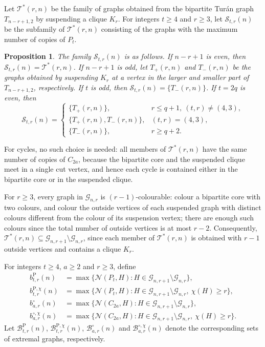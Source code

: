 \documentclass[11pt]{article}
\newtheorem{proposition}[theorem]{Proposition}
\theoremstyle{definition}
\theoremstyle{plain}
\theoremstyle{remark}
\theoremstyle{plain}
\numberwithin{equation}{section}
\newcommand{\cG}{\mathcal G}
\newcommand{\cB}{\mathcal B}
\newcommand{\cS}{\mathcal S}
\newcommand{\cT}{\mathcal T}
\newcommand{\N}{\mathcal N}
\begin{document}
Let $\cT^*(r,n)$ be the family of graphs obtained from the bipartite Tur\'an graph $T_{n-r+1,2}$ by suspending a clique $K_r$. For integers $t\ge4$ and $r\ge3$, let $\cS_{t,r}(n)$ be the subfamily of $\cT^*(r,n)$ consisting of the graphs with the maximum number of copies of $P_t$.

\begin{proposition}\label{prop:Tstar-path-choice}
The family $\cS_{t,r}(n)$ is as follows. If $n-r+1$ is even, then $\cS_{t,r}(n)=\cT^*(r,n)$. If $n-r+1$ is odd, let $T_+(r,n)$ and $T_-(r,n)$ be the graphs obtained by suspending $K_r$ at a vertex in the larger and smaller part of $T_{n-r+1,2}$, respectively. If $t$ is odd, then $\cS_{t,r}(n)=\{T_-(r,n)\}$. If $t=2q$ is even, then
\[
        \cS_{t,r}(n)=
        \begin{cases}
        \{T_+(r,n)\}, & r\le q+1,\ (t,r)\ne(4,3),\\
        \{T_+(r,n),T_-(r,n)\}, & (t,r)=(4,3),\\
        \{T_-(r,n)\}, & r\ge q+2.
        \end{cases}
\]
\end{proposition}
For cycles, no such choice is needed: all members of $\cT^*(r,n)$ have the same number of copies of $C_{2a}$, because the bipartite core and the suspended clique meet in a single cut vertex, and hence each cycle is contained either in the bipartite core or in the suspended clique.

For $r\ge3$, every graph in $\cG_{n,r}$ is $(r-1)$-colourable: colour a bipartite core with two colours, and colour the outside vertices of each suspended graph with distinct colours different from the colour of its suspension vertex; there are enough such colours since the total number of outside vertices is at most $r-2$.
Consequently, $\cT^*(r,n)\subseteq \cG_{n,r+1}\setminus\cG_{n,r}$, since each member of $\cT^*(r,n)$ is obtained with $r-1$ outside vertices and contains a clique $K_r$.

For integers $t\ge4$, $a\ge2$ and $r\ge3$, define
\[
\begin{aligned}
        b^{\mathrm P}_{t,r}(n)
        &=\max\{\N(P_t,H):H\in\cG_{n,r+1}\setminus\cG_{n,r}\},\\
        b^{\mathrm P,\chi}_{t,r}(n)
        &=\max\{\N(P_t,H):H\in\cG_{n,r+1}\setminus\cG_{n,r},\ \chi(H)\ge r\},\\
        b^{\circ}_{a,r}(n)
        &=\max\{\N(C_{2a},H):H\in\cG_{n,r+1}\setminus\cG_{n,r}\},\\
        b^{\circ,\chi}_{a,r}(n)
        &=\max\{\N(C_{2a},H):H\in\cG_{n,r+1}\setminus\cG_{n,r},\ \chi(H)\ge r\}.
\end{aligned}
\]
Let $\cB^{\mathrm P}_{t,r}(n)$, $\cB^{\mathrm P,\chi}_{t,r}(n)$, $\cB^{\circ}_{a,r}(n)$ and $\cB^{\circ,\chi}_{a,r}(n)$ denote the corresponding sets of extremal graphs, respectively.
\end{document}

